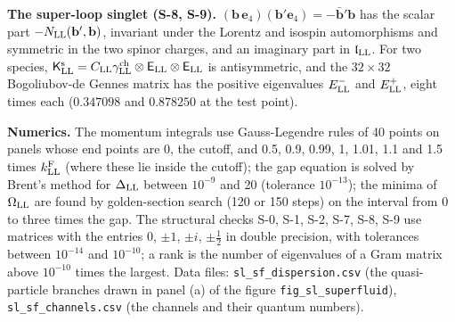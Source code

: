 \documentclass[
  10pt,
]{article}
\begin{document}
\textbf{The super-loop singlet (S-8, S-9).}
\((\mathbf b\,\mathbf e_4)(\mathbf b'\mathbf e_4)=-\bar{\mathbf b}'\mathbf b\)
has the scalar part \(-N_{\rm LL}(\mathbf b',\mathbf b)\), invariant
under the Lorentz and isospin automorphisms and symmetric in the two
spinor charges, and an imaginary part in \(\mathfrak l_{\rm LL}\). For
two species,
\(\mathsf K^{\rm s}_{\rm LL}=C_{\rm LL}\gamma^{\rm ch}_{\rm LL}\otimes\mathsf E_{\rm LL}\otimes\mathsf E_{\rm LL}\)
is antisymmetric, and the \(32\times32\) Bogoliubov-de Gennes matrix has
the positive eigenvalues \(E^-_{\rm LL}\) and \(E^+_{\rm LL}\), eight
times each (\(0.347098\) and \(0.878250\) at the test point).

\textbf{Numerics.} The momentum integrals use Gauss-Legendre rules of 40
points on panels whose end points are 0, the cutoff, and 0.5, 0.9, 0.99,
1, 1.01, 1.1 and 1.5 times \(k^{\rm F}_{\rm LL}\) (where these lie
inside the cutoff); the gap equation is solved by Brent's method for
\(\Delta_{\rm LL}\) between \(10^{-9}\) and 20 (tolerance \(10^{-13}\));
the minima of \(\Omega_{\rm LL}\) are found by golden-section search
(120 or 150 steps) on the interval from 0 to three times the gap. The
structural checks S-0, S-1, S-2, S-7, S-8, S-9 use matrices with the
entries 0, \(\pm1\), \(\pm i\), \(\pm\tfrac12\) in double precision,
with tolerances between \(10^{-14}\) and \(10^{-10}\); a rank is the
number of eigenvalues of a Gram matrix above \(10^{-10}\) times the
largest. Data files: \texttt{sl\_sf\_dispersion.csv} (the quasi-particle
branches drawn in panel (a) of the figure \texttt{fig\_sl\_superfluid}),
\texttt{sl\_sf\_channels.csv} (the channels and their quantum numbers).
\end{document}
